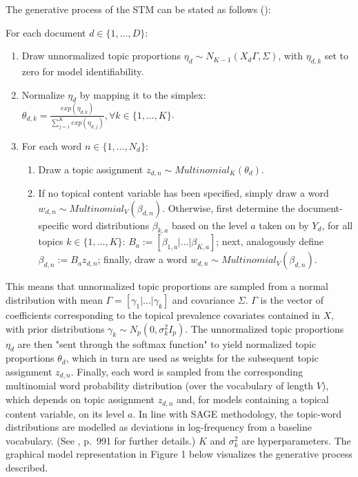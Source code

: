 \noindent
The generative process of the STM can be stated as follows (\citealp{roberts2016model}):

\vspace{0.25cm}
\noindent
For each document $d \in \{1,\dots,D\}$:

\begin{enumerate}[{1)}]
\vspace{-0.25cm}
\item Draw unnormalized topic proportions $\eta_d \sim N_{K-1}(X_d\Gamma, \Sigma)$, with $\eta_{d,k}$ set to zero for model identifiability.
\vspace{-0.25cm}
\item Normalize $\eta_d$ by mapping it to the simplex: $\theta_{d,k} = \frac{exp(\eta_{d,k})}{\sum_{j=1}^{K}exp(\eta_{d,j})}, \forall k \in \{1,\dots,K\}$.
\vspace{-0.25cm}
\item For each word $n \in \{1,\dots,N_d\}$:
	\begin{enumerate}[{a)}]
	\vspace{-0.25cm}    
    \item Draw a topic assignment $z_{d,n} \sim Multinomial_K(\theta_d)$.
	\vspace{-0.25cm}    
    \item If no topical content variable has been specified, simply draw a word $w_{d,n} \sim Multinomial_V(\beta_{d,n})$. Otherwise, first determine the document-specific word distributions $\beta_{k,a}$ based on the level $a$ taken on by $Y_d$, for all topics $k \in \{1,\dots,K\}$: $B_a := [\beta_{1,a}|\dots|\beta_{K,a}]$; next, analogously define $\beta_{d,n}:=B_az_{d,n}$; finally, draw a word $w_{d,n} \sim Multinomial_V(\beta_{d,n})$.
	\end{enumerate}
\end{enumerate}

\noindent
This means that unnormalized topic proportions are sampled from a normal distribution with mean $\Gamma = [\gamma_1|\dots|\gamma_k]$ and covariance $\Sigma$. $\Gamma$ is the vector of coefficients corresponding to the topical prevalence covariates contained in $X$, with prior distributions $\gamma_k \sim N_p(0, \sigma_k^2I_p)$. The unnormalized topic proportions $\eta_d$ are then "sent through the softmax function" to yield normalized topic proportions $\theta_d$, which in turn are used as weights for the subsequent topic assignment $z_{d,n}$. Finally, each word is sampled from the corresponding multinomial word probability distribution (over the vocabulary of length $V$), which depends on topic assignment $z_{d,n}$ and, for models containing a topical content variable, on its level $a$. In line with SAGE methodology, the topic-word distributions are modelled as deviations in log-frequency from a baseline vocabulary. (See \cite{roberts2016model}, p.\ 991 for further details.) $K$ and $\sigma_k^2$ are hyperparameters. The graphical model representation in Figure 1 below visualizes the generative process described.


